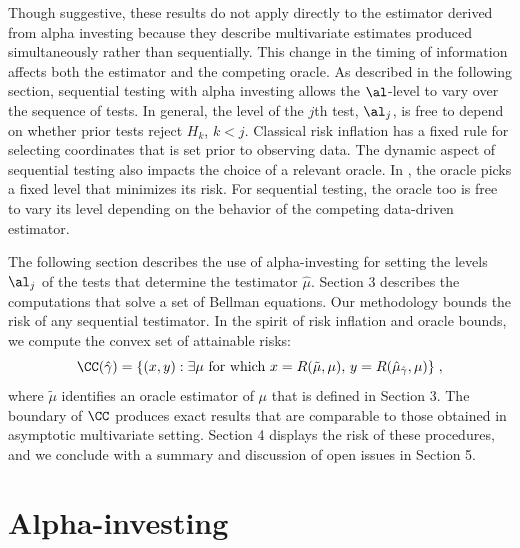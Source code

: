 \documentclass[12pt]{article}
\begin{document}
 Though suggestive, these results do not apply directly to the estimator derived
 from alpha investing because they describe multivariate estimates produced
 simultaneously rather than sequentially.  This change in the timing of
 information affects both the estimator and the competing oracle.  As described
 in the following section, sequential testing with alpha investing allows the
 $\al$-level to vary over the sequence of tests.  In general, the level of the
 $j$th test, $\al_j$, is free to depend on whether prior tests reject $H_k$, $k
 < j$.  Classical risk inflation has a fixed rule for selecting coordinates that
 is set prior to observing data.  The dynamic aspect of sequential testing also
 impacts the choice of a relevant oracle.  In , the oracle picks a
 fixed level that minimizes its risk.  For sequential testing, the oracle too is
 free to vary its level depending on the behavior of the competing data-driven
 estimator.


 The following section describes the use of alpha-investing for setting the
 levels $\al_j$ of the tests that determine the testimator $\hat\mu$.  Section 3
 describes the computations that solve a set of Bellman equations.  Our
 methodology bounds the risk of any sequential testimator.  In the spirit of
 risk inflation and oracle bounds, we compute the convex set of attainable
 risks:
 \begin{equation}
   \CC(\hat\gamma) 
      = \{(x,y): \exists \mu \mbox{ for which }
                 x=R(\tilde\mu,\mu), \, y = R(\hat\mu_{\hat\gamma},\mu)\} \;,
 \label{eq:C}
 \end{equation}
 where $\tilde\mu$ identifies an oracle estimator of $\mu$ that is defined in
 Section 3.  The boundary of $\CC$ produces exact results that are comparable to
 those obtained in asymptotic multivariate setting.  Section 4 displays the risk
 of these procedures, and we conclude with a summary and discussion of open
 issues in Section 5.


\section{ Alpha-investing }
\end{document}
